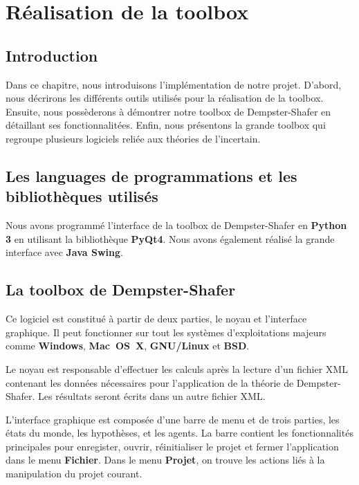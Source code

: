 \chapter{Réalisation de la toolbox}

\section{Introduction}

Dans ce chapitre, nous introduisons l'implémentation de notre projet. D'abord, nous 
décrirons les différents outils utilisés pour la réalisation de la toolbox. Ensuite,
nous possèderons à démontrer notre toolbox de Dempster-Shafer en détaillant ses
fonctionnalitées. Enfin, nous présentons la grande toolbox qui regroupe plusieurs
logiciels reliée aux théories de l'incertain.

\section{Les languages de programmations et les bibliothèques utilisés}

Nous avons programmé l'interface de la toolbox de Dempster-Shafer en \textbf{Python 3}
en utilisant la bibliothèque \textbf{PyQt4}. Nous avons également réalisé la grande
interface avec \textbf{Java Swing}.

\section{La toolbox de Dempster-Shafer}

Ce logiciel est constitué à partir de deux parties, le noyau et l'interface graphique.
Il peut fonctionner sur tout les systèmes d'exploitations majeurs comme \textbf{Windows},
\textbf{Mac~OS~X}, \textbf{GNU/Linux} et \textbf{BSD}.

Le noyau est responsable d'effectuer les calculs après la lecture d'un fichier XML
contenant les données nécessaires pour l'application de la théorie de Dempster-Shafer.
Les résultats seront écrits dans un autre fichier XML.

L'interface graphique est composée d'une barre de menu et de trois parties, les états
du monde, les hypothèses, et les agents. La barre contient les fonctionnalités principales
pour enregister, ouvrir, réinitialiser le projet et fermer l'application dans le menu
\textbf{Fichier}. Dans le menu \textbf{Projet}, on trouve les actions liés à la manipulation
du projet courant.